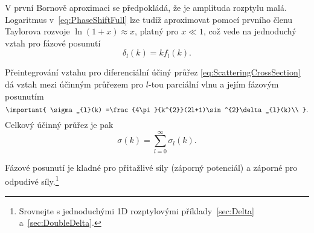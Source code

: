 V první Bornově aproximaci se předpokládá, že je amplituda rozptylu malá.
Logaritmus v~\eqref{eq:PhaseShiftFull} lze tudíž aproximovat pomocí prvního členu Taylorova rozvoje $\ln(1+x)\approx x$, platný pro $x\ll1$, což vede na jednoduchý vztah pro fázové posunutí
\begin{equation}
    \label{eq:PhaseShiftApprox}
    \boxed{\delta_{l}(k)=k f_{l}(k)}.
\end{equation}

Přeintegrování vztahu pro diferenciální účiný průřez \eqref{eq:ScatteringCrossSection} dá vztah mezi účinným průřezem pro $l$-tou parciální vlnu a jejím fázovým posunutím
\begin{equation}\label{eq:ScatteringSigmal}
    \important{
        \sigma_{l}(k)
            =\frac{4\pi}{k^{2}}(2l+1)\sin^{2}\delta_{l}(k)\\
    }.
\end{equation}
Celkový účinný průřez je pak
\begin{equation}
    \sigma(k)
        =\sum_{l=0}^{\infty}\sigma_{l}(k).
\end{equation}

Fázové posunutí je kladné pro přitažlivé síly (záporný potenciál) a záporné pro odpudivé síly.\footnote{
    Srovnejte s jednoduchými 1D rozptylovými příklady~\ref{sec:Delta} a~\ref{sec:DoubleDelta}.
}